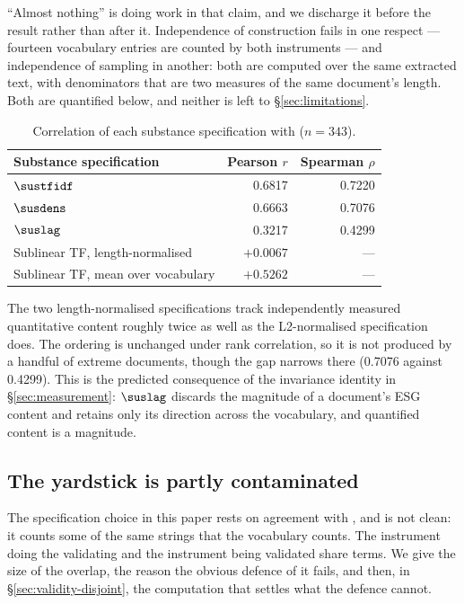 ``Almost nothing'' is doing work in that claim, and we discharge it before the result rather
than after it. Independence of construction fails in one respect --- fourteen vocabulary
entries are counted by both instruments --- and independence of sampling in another: both
are computed over the same extracted text, with denominators that are two measures of the
same document's length. Both are quantified below, and neither is left to
\S\ref{sec:limitations}.

\begin{table}[htbp]
\centering
\caption{Correlation of each substance specification with \QUANT{} ($n = 343$).}
\label{tab:validity-quant}
\begin{tabular}{@{}lrr@{}}
\toprule
Substance specification & Pearson $r$ & Spearman $\rho$ \\
\midrule
$\sustfidf$ & 0.6817 & 0.7220 \\
$\susdens$ & 0.6663 & 0.7076 \\
$\suslag$ & 0.3217 & 0.4299 \\
Sublinear TF, length-normalised & $+0.0067$ & --- \\
Sublinear TF, mean over vocabulary & $+0.5262$ & --- \\
\bottomrule
\end{tabular}
\end{table}

The two length-normalised specifications track independently measured quantitative
content roughly twice as well as the L2-normalised specification does. The ordering is
unchanged under rank correlation, so it is not produced by a handful of extreme documents,
though the gap narrows there (0.7076 against 0.4299). This is the predicted consequence of
the invariance identity in \S\ref{sec:measurement}: $\suslag$ discards the magnitude of a
document's ESG content and retains only its direction across the vocabulary, and quantified
content is a magnitude.

\subsection{The yardstick is partly contaminated}

The specification choice in this paper rests on agreement with \QUANT{}, and \QUANT{} is not
clean: it counts some of the same strings that the \SUS{} vocabulary counts. The instrument
doing the validating and the instrument being validated share terms. We give the size of the
overlap, the reason the obvious defence of it fails, and then, in
\S\ref{sec:validity-disjoint}, the computation that settles what the defence cannot.

